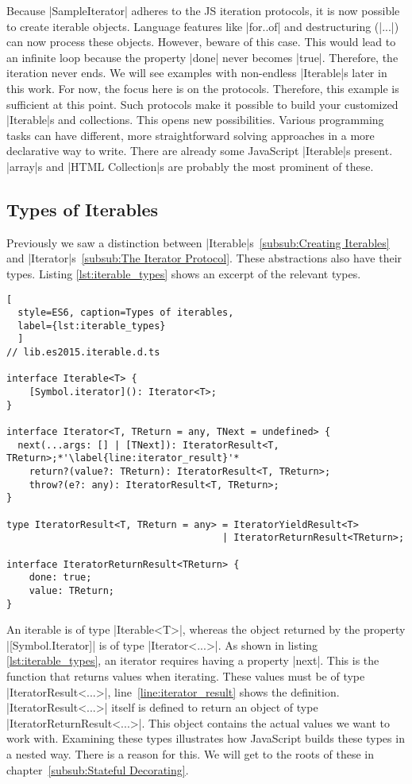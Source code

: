 Because |SampleIterator| adheres to the JS iteration protocols, it is now 
possible to create iterable objects. Language features like |for..of| and 
destructuring (|...|) can now process these objects. However, beware of this 
case. This would lead to an infinite loop because the property |done| never 
becomes |true|. Therefore, the iteration never ends. We will see examples 
with non-endless |Iterable|s later in this work. 
For now, the focus here is on the protocols. Therefore, this 
example is sufficient at this point.
\newline
Such protocols make it possible to build your customized |Iterable|s and
collections. This opens new possibilities. Various programming tasks can have 
different, more straightforward solving approaches in a more declarative way to
write.
There are already some JavaScript |Iterable|s present. |array|s and
|HTML Collection|s are probably the most prominent of these.

\subsection{Types of Iterables}
\label{sub:Types of Iterables}
Previously we saw a distinction between 
|Iterable|s~\ref{subsub:Creating Iterables} and 
|Iterator|s~\ref{subsub:The Iterator Protocol}. These abstractions also have their 
types. Listing \ref{lst:iterable_types} shows an excerpt of the relevant types.

\begin{lstlisting}[
  style=ES6, caption=Types of iterables,
  label={lst:iterable_types}
  ]
// lib.es2015.iterable.d.ts

interface Iterable<T> {
    [Symbol.iterator](): Iterator<T>;
}

interface Iterator<T, TReturn = any, TNext = undefined> {
  next(...args: [] | [TNext]): IteratorResult<T, TReturn>;*'\label{line:iterator_result}'*
    return?(value?: TReturn): IteratorResult<T, TReturn>;
    throw?(e?: any): IteratorResult<T, TReturn>;
}

type IteratorResult<T, TReturn = any> = IteratorYieldResult<T> 
                                      | IteratorReturnResult<TReturn>;

interface IteratorReturnResult<TReturn> {
    done: true;
    value: TReturn;
}
\end{lstlisting}

An iterable is of type |Iterable<T>|, whereas the object returned by the property
|[Symbol.Iterator]| is of type |Iterator<...>|. As shown in listing
\ref{lst:iterable_types}, an iterator requires having a property |next|. 
This is the function that returns values when iterating. These values must be 
of type |IteratorResult<...>|, line~\ref{line:iterator_result} shows the 
definition. |IteratorResult<...>| itself is defined to return an 
object of type |IteratorReturnResult<...>|. This object contains the actual 
values we want to work with. Examining these types illustrates how JavaScript 
builds these types in a nested way. There is a reason for this. We will get to 
the roots of these in chapter~\ref{subsub:Stateful Decorating}.

